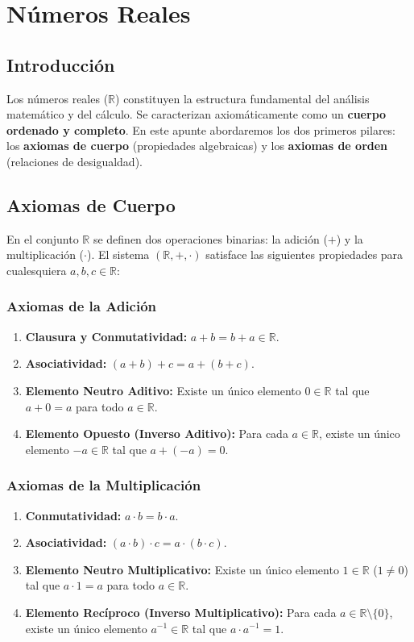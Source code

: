 \chapter{Números Reales}
\section{Introducción}
Los números reales ($\mathbb{R}$) constituyen la estructura fundamental del análisis matemático y del cálculo. Se caracterizan axiomáticamente como un \textbf{cuerpo ordenado y completo}. En este apunte abordaremos los dos primeros pilares: los \textbf{axiomas de cuerpo} (propiedades algebraicas) y los \textbf{axiomas de orden} (relaciones de desigualdad).

\section{Axiomas de Cuerpo}
En el conjunto $\mathbb{R}$ se definen dos operaciones binarias: la adición ($+$) y la multiplicación ($\cdot$). El sistema $(\mathbb{R}, +, \cdot)$ satisface las siguientes propiedades para cualesquiera $a, b, c \in \mathbb{R}$:

\subsection{Axiomas de la Adición}
\begin{enumerate}[label=\textbf{A.\arabic*}]
    \item \textbf{Clausura y Conmutatividad:} $a + b = b + a \in \mathbb{R}$.
    \item \textbf{Asociatividad:} $(a + b) + c = a + (b + c)$.
    \item \textbf{Elemento Neutro Aditivo:} Existe un único elemento $0 \in \mathbb{R}$ tal que $a + 0 = a$ para todo $a \in \mathbb{R}$.
    \item \textbf{Elemento Opuesto (Inverso Aditivo):} Para cada $a \in \mathbb{R}$, existe un único elemento $-a \in \mathbb{R}$ tal que $a + (-a) = 0$.
\end{enumerate}

\subsection{Axiomas de la Multiplicación}
\begin{enumerate}[label=\textbf{M.\arabic*}]
    \item \textbf{Conmutatividad:} $a \cdot b = b \cdot a$.
    \item \textbf{Asociatividad:} $(a \cdot b) \cdot c = a \cdot (b \cdot c)$.
    \item \textbf{Elemento Neutro Multiplicativo:} Existe un único elemento $1 \in \mathbb{R}$ ($1 \neq 0$) tal que $a \cdot 1 = a$ para todo $a \in \mathbb{R}$.
    \item \textbf{Elemento Recíproco (Inverso Multiplicativo):} Para cada $a \in \mathbb{R} \setminus \{0\}$, existe un único elemento $a^{-1} \in \mathbb{R}$ tal que $a \cdot a^{-1} = 1$.
\end{enumerate}

